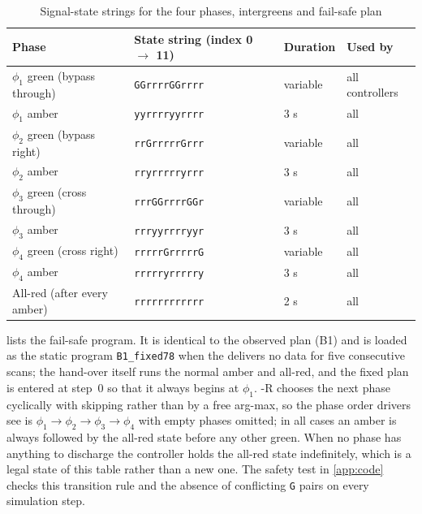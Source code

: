 \begin{table}[htbp]
\centering
\caption{Signal-state strings for the four phases, intergreens and fail-safe plan}\label{tab:app-states}
\small
\begin{tabular}{@{}llll@{}}
\toprule
Phase & State string (index 0 $\rightarrow$ 11) & Duration & Used by\\
\midrule
$\phi_1$ green (bypass through) & \texttt{GGrrrrGGrrrr} & variable & all controllers\\
$\phi_1$ amber & \texttt{yyrrrryyrrrr} & 3 s & all\\
$\phi_2$ green (bypass right) & \texttt{rrGrrrrrGrrr} & variable & all\\
$\phi_2$ amber & \texttt{rryrrrrryrrr} & 3 s & all\\
$\phi_3$ green (cross through) & \texttt{rrrGGrrrrGGr} & variable & all\\
$\phi_3$ amber & \texttt{rrryyrrrryyr} & 3 s & all\\
$\phi_4$ green (cross right) & \texttt{rrrrrGrrrrrG} & variable & all\\
$\phi_4$ amber & \texttt{rrrrryrrrrry} & 3 s & all\\
All-red (after every amber) & \texttt{rrrrrrrrrrrr} & 2 s & all\\
\bottomrule
\end{tabular}
\end{table}

 lists the fail-safe program. It is identical to the observed plan (B1) and is
loaded as the static program \texttt{B1\_fixed78} when the \vls{} delivers no data for five
consecutive scans; the hand-over itself runs the normal amber and all-red, and the fixed plan is entered at
step~0 so that it always begins at $\phi_1$. \prism{}-R chooses the next phase cyclically with skipping
rather than by a free arg-max, so the phase order drivers see is $\phi_1 \rightarrow \phi_2 \rightarrow
\phi_3 \rightarrow \phi_4$ with empty phases omitted; in all cases an amber is always followed by the
all-red state before any other green. When no phase has anything to discharge the controller holds the
all-red state indefinitely, which is a legal state of this table rather than a new one. The safety test in \cref{app:code} checks this transition rule
and the absence of conflicting \texttt{G} pairs on every simulation step.

